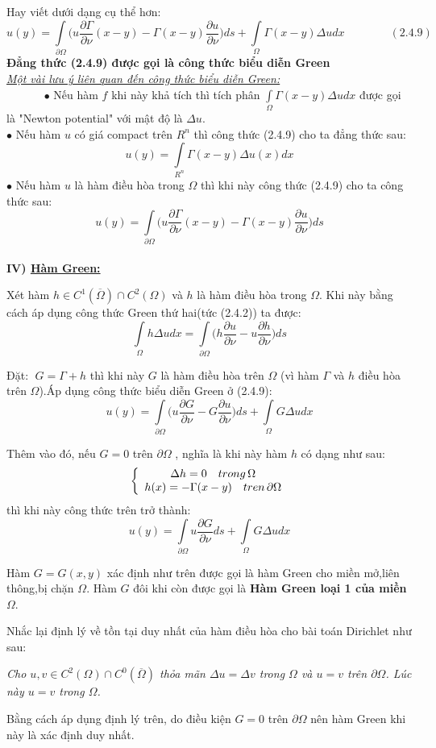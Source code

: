 Hay viết dưới dạng cụ thể hơn:
\[u(y) = \int\limits_{\partial \Omega } {(u\frac{{\partial \Gamma }}{{\partial \nu }}} (x - y) - \Gamma (x - y)\frac{{\partial u}}{{\partial \nu }})ds + \int\limits_\Omega  {\Gamma (x - y)\Delta udx} \quad \quad \quad \quad (2.4.9)\]
\textbf{Đẳng thức (2.4.9) được gọi là công thức biểu diễn Green}
\\
\textit{\underline{Một vài lưu ý liên quan đến công thức biểu diễn Green:}}
\\
$\quad \quad \quad$ $\bullet$ Nếu hàm $f$ khi này khả tích thì tích phân $\int\limits_\Omega  {\Gamma (x - y)\Delta udx} $ được gọi là "Newton potential" với mật độ là $\Delta u$.\\
$\bullet$ Nếu hàm $u$ có giá compact trên $R^{n}$ thì công thức (2.4.9) cho ta đẳng thức sau:
\[u(y) = \int\limits_{R^n } {\Gamma (x - y)\Delta u(x)dx} \]
$\bullet$ Nếu hàm $u$ là hàm điều hòa trong $\Omega$ thì khi này công thức (2.4.9) cho ta công thức sau:
\[
u(y) = \int\limits_{\partial \Omega } {(u\frac{{\partial \Gamma }}{{\partial \nu }}} (x - y) - \Gamma (x - y)\frac{{\partial u}}{{\partial \nu }})ds
\]
\\
\textbf{IV) \underline{Hàm Green:}}

Xét hàm  $h \in C^1 (\overline \Omega  ) \cap C^2 (\Omega )$ và $h$ là hàm điều hòa trong $\Omega$. Khi này bằng cách áp dụng công thức Green thứ hai(tức (2.4.2)) ta được:
\[
\int\limits_\Omega  {h\Delta u} dx = \int\limits_{\partial \Omega } {(h\frac{{\partial u}}
{{\partial \nu }}}  - u\frac{{\partial h}}
{{\partial \nu }})ds
\]

Đặt:$\;$ $G = \Gamma  + h$ thì khi này $G$ là hàm điều hòa trên $\Omega$ (vì hàm $\Gamma$ và $h$ điều hòa trên $\Omega$).Áp dụng công thức biểu diễn Green ở (2.4.9):\\
\[
u(y) = \int\limits_{\partial \Omega } {(u\frac{{\partial G}}{{\partial \nu }}}  - G\frac{{\partial u}}{{\partial \nu }})ds + \int\limits_\Omega  {G\Delta udx} 
\]

Thêm vào đó, nếu $G=0$ trên $\partial \Omega $ , nghĩa là khi này hàm $h$ có dạng như sau:
\[
\left\{ {\begin{array}{*{20}c}
   {\Delta h = 0\quad trong\,\Omega }  \\
   {h(x) =  - \Gamma (x - y)\quad tren \,\partial \Omega }  \\
\end{array}} \right.
\]
thì khi này công thức trên trở thành:
\[
u(y) = \int\limits_{\partial \Omega } {u\frac{{\partial G}}{{\partial \nu }}} ds + \int\limits_\Omega  {G\Delta udx} 
\]
	
Hàm $G=G(x,y)$ xác định như trên được gọi là hàm Green cho miền mở,liên thông,bị chặn $\Omega$. Hàm $G$ đôi khi còn được gọi là \textbf{Hàm Green loại 1 của miền $\Omega$}.

Nhắc lại định lý về tồn tại duy nhất của hàm điều hòa cho bài toán Dirichlet như sau:

\textit{Cho $u,v \in C^2 (\Omega ) \cap C^0 (\overline \Omega  )$ thỏa mãn $
\Delta u = \Delta v$ trong $\Omega$ và $u=v$ trên $\partial \Omega$. Lúc này $u=v$ trong $\Omega$.}

Bằng cách áp dụng định lý trên, do điều kiện $G=0$ trên $\partial \Omega $ nên hàm Green khi này là xác định duy nhất.
